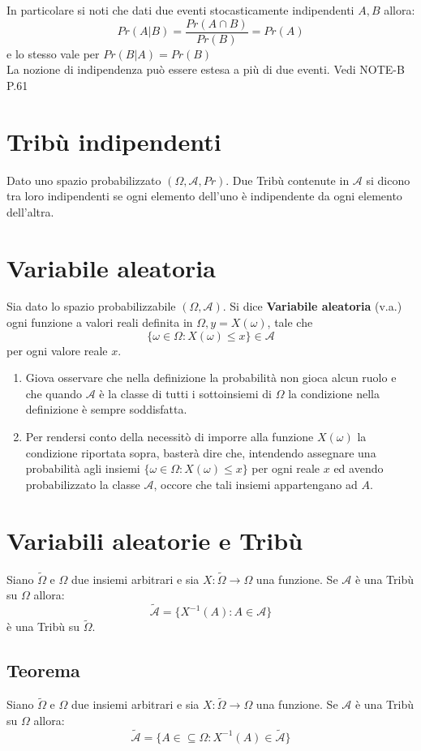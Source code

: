 \documentclass[12pt]{report}
\begin{document}
  In particolare si noti che dati due eventi stocasticamente indipendenti $A, B$ allora:
  $$Pr(A|B) = \frac{Pr(A \cap B)}{Pr(B)} = Pr(A)$$
  e lo stesso vale per $Pr(B|A) = Pr(B)$\\

  La nozione di indipendenza può essere estesa a più di due eventi. Vedi NOTE-B P.61

  \section{Tribù indipendenti}
  Dato uno spazio probabilizzato $(\Omega, \mathcal{A}, Pr)$. Due Tribù contenute in $\mathcal{A}$ si dicono tra loro indipendenti se ogni elemento dell'uno è indipendente da ogni elemento dell'altra.

  \section{Variabile aleatoria}
  Sia dato lo spazio probabilizzabile $(\Omega, \mathcal{A})$. Si dice \textbf{Variabile aleatoria} (v.a.) ogni funzione a valori reali definita in $\Omega, y = X(\omega)$, tale che
  $$ \{\omega \in \Omega : X(\omega) \leq x\} \in \mathcal{A} $$ per ogni valore reale $x$.
  \begin{enumerate}
    \item Giova osservare che nella definizione la probabilità non gioca alcun ruolo e che quando $\mathcal{A}$ è la classe di tutti i sottoinsiemi di $\Omega$ la condizione nella definizione è sempre soddisfatta.
    \item Per rendersi conto della necessitò di imporre alla funzione $X(\omega)$ la condizione riportata sopra, basterà dire che, intendendo assegnare una probabilità agli insiemi $\{\omega \in \Omega : X(\omega) \leq x\}$ per ogni reale $x$ ed avendo probabilizzato la classe $\mathcal{A}$, occore che tali insiemi appartengano ad $A$.
  \end{enumerate}

  \section{Variabili aleatorie e Tribù}
  Siano $\tilde{\Omega}$ e $\Omega$ due insiemi arbitrari e sia $X: \tilde{\Omega} \rightarrow \Omega$ una funzione. Se $\mathcal{A}$ è una Tribù su $\Omega$ allora:
  $$ \tilde{\mathcal{A}} = \{ X^{-1}(A):A \in \mathcal{A} \} $$
  è una Tribù su $\tilde{\Omega}$.

  \subsection{Teorema}
  Siano $\tilde{\Omega}$ e $\Omega$ due insiemi arbitrari e sia $X: \tilde{\Omega} \rightarrow \Omega$ una funzione. Se $\mathcal{A}$ è una Tribù su $\Omega$ allora:
  $$ \tilde{\mathcal{A}} = \{ A \in \subseteq \Omega: X^{-1}(A) \in \tilde{\mathcal{A}}\} $$
\end{document}
